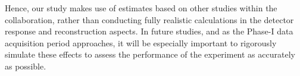 Hence, our study makes use of estimates based on other studies within the
collaboration, rather than conducting fully realistic calculations in the
detector response and reconstruction aspects. In future studies, and as
the Phase\nobreakdash-I data acquisition period approaches, it will be
especially important to rigorously simulate these effects to assess the
performance of the experiment as accurately as possible.
